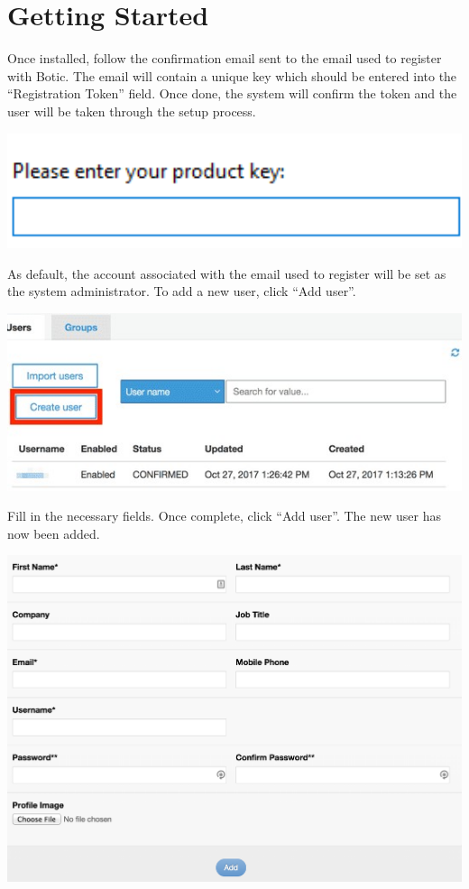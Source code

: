 \documentclass[11pt]{article}
\begin{document}
\section {Getting Started}
\begin{flushleft}
	Once installed, follow the confirmation email sent to the email used to register with Botic. The email will contain a unique key which should be entered into the “Registration Token” field. Once done, the system will confirm the token and the user will be taken through the setup process.
\end{flushleft}
\includegraphics[width=1.0\textwidth]{images/ProductKey.png}

\begin{flushleft}
	As default, the account associated with the email used to register will be set as the system administrator. To add a new user, click “Add user”.
\end{flushleft}
\includegraphics[width=1.0\textwidth]{images/CreateUser.jpg}

\begin{flushleft}
	Fill in the necessary fields. Once complete, click “Add user”. The new user has now been added.
\end{flushleft}
\includegraphics[width=1.0\textwidth]{images/AddUserForm.png}
\end{document}

